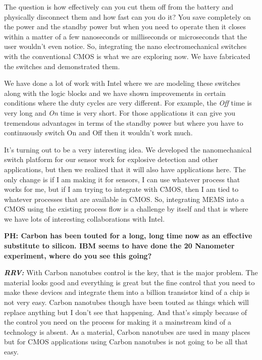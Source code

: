 \begin{multicols}{2}
The question is how effectively can you cut them off from the battery and physically disconnect them and how fast can you do it?  You save completely on the power and the standby power but when you need to operate then it closes within a matter of a few nanoseconds or milliseconds or microseconds that the user wouldn’t even notice. So, integrating the nano electromechanical switches with the conventional CMOS is what we are exploring now. We have fabricated the switches and demonstrated them.

We have done a lot of work with Intel where we are modeling these switches along with the logic blocks and we have shown improvements in certain conditions where the duty cycles are very different. For example, the \textit{Off} time is very long and \textit{On} time is very short. For those applications it can give you tremendous advantages in terms of the standby power but where you have to continuously switch On and Off then it wouldn’t work much.

It’s turning out to be a very interesting idea. We developed the nanomechanical switch platform for our sensor work for explosive detection and other applications, but then we realized that it will also have applications here. The only change is if I am making it for sensors, I can use whatever process that works for me, but if I am trying to integrate with CMOS, then I am tied to whatever processes that are available in CMOS. So, integrating MEMS into a CMOS using the existing process flow is a challenge by itself and that is where we have lots of interesting collaborations with Intel.

\textbf{PH: Carbon has been touted for a long, long time now as an effective substitute to silicon. IBM seems to have done the 20 Nanometer experiment, where do you see this going?}

\textbf{\textit{RRV:}} With Carbon nanotubes control is the key, that is the major problem. The material looks good and everything is great but the fine control that you need to make these devices and integrate them into a billion transistor kind of a chip is not very easy. Carbon nanotubes though have been touted as things which will replace anything but I don’t see that happening. And that’s simply because of the control you need on the process for making it a mainstream kind of a technology is absent. As a material, Carbon nanotubes are used in many places but for CMOS applications using Carbon nanotubes is not going to be all that easy.


\end{multicols}
